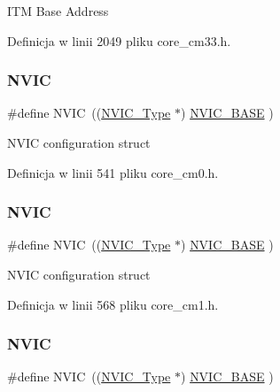 I\+TM Base Address 

Definicja w linii 2049 pliku core\+\_\+cm33.\+h.

\mbox{\label{group___c_m_s_i_s__core__base_gac8e97e8ce56ae9f57da1363a937f8a17}} 
\subsubsection{\texorpdfstring{N\+V\+IC}{NVIC}\hspace{0.1cm}{\footnotesize\ttfamily [1/12]}}
{\footnotesize\ttfamily \#define N\+V\+IC~((\hyperlink{struct_n_v_i_c___type}{N\+V\+I\+C\+\_\+\+Type}      $\ast$)     \hyperlink{group___c_m_s_i_s__core__base_gaa0288691785a5f868238e0468b39523d}{N\+V\+I\+C\+\_\+\+B\+A\+SE}     )}

N\+V\+IC configuration struct 

Definicja w linii 541 pliku core\+\_\+cm0.\+h.

\mbox{\label{group___c_m_s_i_s__core__base_gac8e97e8ce56ae9f57da1363a937f8a17}} 
\subsubsection{\texorpdfstring{N\+V\+IC}{NVIC}\hspace{0.1cm}{\footnotesize\ttfamily [2/12]}}
{\footnotesize\ttfamily \#define N\+V\+IC~((\hyperlink{struct_n_v_i_c___type}{N\+V\+I\+C\+\_\+\+Type}      $\ast$)     \hyperlink{group___c_m_s_i_s__core__base_gaa0288691785a5f868238e0468b39523d}{N\+V\+I\+C\+\_\+\+B\+A\+SE}     )}

N\+V\+IC configuration struct 

Definicja w linii 568 pliku core\+\_\+cm1.\+h.

\mbox{\label{group___c_m_s_i_s__core__base_gac8e97e8ce56ae9f57da1363a937f8a17}} 
\subsubsection{\texorpdfstring{N\+V\+IC}{NVIC}\hspace{0.1cm}{\footnotesize\ttfamily [3/12]}}
{\footnotesize\ttfamily \#define N\+V\+IC~((\hyperlink{struct_n_v_i_c___type}{N\+V\+I\+C\+\_\+\+Type}      $\ast$)     \hyperlink{group___c_m_s_i_s__core__base_gaa0288691785a5f868238e0468b39523d}{N\+V\+I\+C\+\_\+\+B\+A\+SE}     )}


